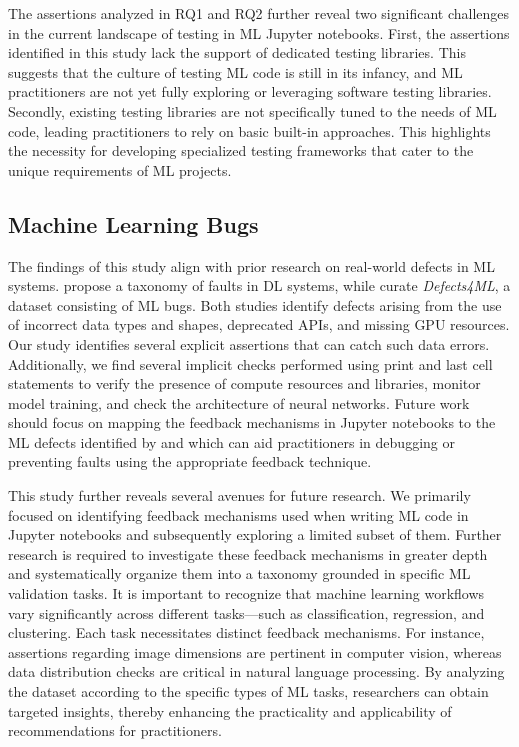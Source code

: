 \documentclass[journal]{IEEEtran}       %
\begin{document}
The assertions analyzed in RQ1 and RQ2 further reveal two significant
challenges in the current landscape of testing in ML Jupyter
notebooks. First, the assertions identified in this study lack the
support of dedicated testing libraries. This suggests that the
culture of testing ML code is still in its infancy, and ML
practitioners are not yet fully exploring or leveraging software
testing libraries. Secondly, existing testing libraries are not
specifically tuned to the needs of ML code, leading practitioners to
rely on basic built-in approaches. This highlights the necessity for
developing specialized testing frameworks that cater to the unique
requirements of ML projects.

\subsection{Machine Learning Bugs}

The findings of this study align with prior research on real-world
defects in ML systems. \cite{humbatova2020taxonomy} propose a
taxonomy of faults in DL systems, while \cite{morovati2023bugs}
curate \emph{Defects4ML}, a dataset consisting of ML bugs. Both
studies identify defects arising from the use of incorrect data types
and shapes, deprecated APIs, and missing GPU resources. Our study
identifies several explicit assertions that can catch such data
errors. Additionally, we find several implicit checks performed using
print and last cell statements to verify the presence of compute
resources and libraries, monitor model training, and check the
architecture of neural networks. Future work should focus on mapping
the feedback mechanisms in Jupyter notebooks to the ML defects
identified by \cite{humbatova2020taxonomy} and
\cite{morovati2023bugs} which can aid practitioners in debugging or
preventing faults using the appropriate feedback technique.

This study further reveals several avenues for future research. We
primarily focused on identifying feedback mechanisms used when
writing ML code in Jupyter notebooks and subsequently exploring a
limited subset of them. Further research is required to investigate
these feedback mechanisms in greater depth and systematically
organize them into a taxonomy grounded in specific ML validation
tasks. It is important to recognize that machine learning workflows
vary significantly across different tasks---such as classification,
regression, and clustering. Each task necessitates distinct feedback
mechanisms. For instance, assertions regarding image dimensions are
pertinent in computer vision, whereas data distribution checks are
critical in natural language processing. By analyzing the dataset
according to the specific types of ML tasks, researchers can obtain
targeted insights, thereby enhancing the practicality and
applicability of recommendations for practitioners.
\end{document}

